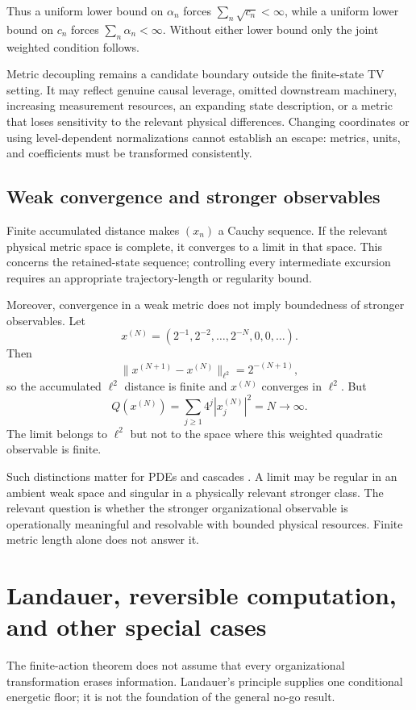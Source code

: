 \documentclass[11pt,a4paper]{article}
\theoremstyle{definition}
\numberwithin{equation}{section}
\begin{document}
Thus a uniform lower bound on $\alpha_n$ forces
$\sum_n\sqrt{c_n}<\infty$, while a uniform lower bound on $c_n$ forces
$\sum_n\alpha_n<\infty$. Without either lower bound only the joint weighted
condition follows.

Metric decoupling remains a candidate boundary outside the finite-state TV
setting. It may reflect genuine causal leverage, omitted downstream machinery,
increasing measurement resources, an expanding state description, or a metric
that loses sensitivity to the relevant physical differences. Changing
coordinates or using level-dependent normalizations cannot establish an escape:
metrics, units, and coefficients must be transformed consistently.

\subsection*{Weak convergence and stronger observables}

Finite accumulated distance makes $(x_n)$ a Cauchy sequence.
If the relevant physical metric space is complete, it converges
to a limit in that space. This concerns the retained-state
sequence; controlling every intermediate excursion requires an
appropriate trajectory-length or regularity bound.

Moreover, convergence in a weak metric does not imply boundedness
of stronger observables. Let
\[
x^{(N)}
=
(2^{-1},2^{-2},\ldots,2^{-N},0,0,\ldots).
\]
Then
\[
\|x^{(N+1)}-x^{(N)}\|_{\ell^2}=2^{-(N+1)},
\]
so the accumulated $\ell^2$ distance is finite and
$x^{(N)}$ converges in $\ell^2$. But
\[
Q(x^{(N)})
=
\sum_{j\ge1}4^j|x_j^{(N)}|^2
=N\to\infty.
\]
The limit belongs to $\ell^2$ but not to the space where this
weighted quadratic observable is finite.

Such distinctions matter for PDEs and cascades
\cite{PierreSchmitt1997,KatzPavlovic2005}.
A limit may be regular in an ambient weak space and singular
in a physically relevant stronger class. The relevant question is whether
the stronger organizational observable is operationally meaningful and
resolvable with bounded physical resources. Finite metric length alone does
not answer it.

\section{Landauer, reversible computation, and other special cases}

The finite-action theorem does not assume that every
organizational transformation erases information. Landauer's
principle supplies one conditional energetic floor; it is not
the foundation of the general no-go result.
\end{document}
